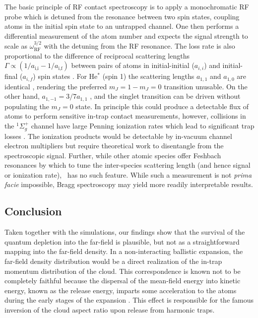 {	The basic principle of RF contact spectroscopy is to apply a monochromatic RF probe which is detuned from the resonance between two spin states, coupling atoms in the initial spin state to an untrapped channel. 
	One then performs a differential measurement of the atom number and expects the signal strength to scale as $\omega_\textrm{RF}^{3/2}$ with the detuning from the RF resonance.
	The loss rate is also proportional to the difference of reciprocal scattering lengths $\Gamma\propto(1/a_\textrm{i,i}-1/a_\textrm{i,f})$ between pairs of atoms in initial-initial ($a_{i,i}$) and initial-final ($a_{i,f}$) spin states \cite{Braaten10,Wild12}. 
	For He$^*$ (spin 1) the scattering lengths $a_{1,1}$ and $a_{1,0}$ are identical \cite{Leo01}, rendering the preferred $m_J=1-m_J=0$ transition unusable. 
	On the other hand, $a_{1,-1} = 3/7 a_{1,1}$ \cite{Vassen16}, and the singlet transition can be driven without populating the $m_J=0$ state. 
	In principle this could produce a detectable flux of atoms to perform sensitive in-trap contact measurements, however, collisions in the $^1\Sigma_{g}^{+}$ channel have large Penning ionization rates which lead to significant trap losses \cite{Leo01}. 
	The ionization products would be detectable by in-vacuum channel electron multipliers but require theoretical work to disentangle from the spectroscopic signal. 
	Further, while other atomic species offer Feshbach resonances by which to tune the inter-species scattering length (and hence signal or ionization rate), \mhe~has no such feature. 
	While such a measurement is not \emph{prima facie} impossible, Bragg spectroscopy may yield more readily interpretable results.
	

\subsection{Conclusion}
	Taken together with the simulations, our findings show that the survival of the quantum depletion into the far-field is plausible, but not as a straightforward mapping into the far-field density.
	In a non-interacting ballistic expansion, the far-field density distribution would be a direct realization of the in-trap momentum distribution of the cloud. 
	This correspondence is known not to be completely faithful because the dispersal of the mean-field energy into kinetic energy, known as the release energy, imparts some acceleration to the atoms during the early stages of the expansion \cite{Ozeri02}. 
	This effect is responsible for the famous inversion of the cloud aspect ratio upon release from harmonic traps. 

}

